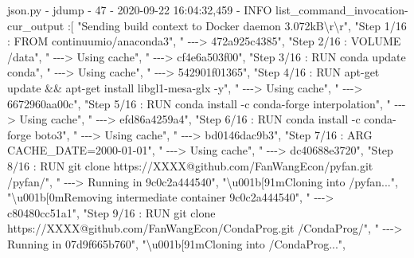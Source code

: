 \documentclass[
]{book}
\newenvironment{Shaded}{\begin{snugshade}}{\end{snugshade}}
\newcommand{\ExtensionTok}[1]{#1}
\newcommand{\NormalTok}[1]{#1}
\newcommand{\StringTok}[1]{\textcolor[rgb]{0.31,0.60,0.02}{#1}}
\begin{document}
\begin{Shaded}
\begin{Highlighting}[]
\ExtensionTok{json.py}\NormalTok{ {-} jdump {-} 47 {-}  2020{-}09{-}22 16:04:32,459 {-} INFO list\_command\_invocation{-}cur\_output}
\NormalTok{:[}
    \StringTok{"Sending build context to Docker daemon  3.072kB\textbackslash{}r\textbackslash{}r"}\NormalTok{,}
    \StringTok{"Step 1/16 : FROM continuumio/anaconda3"}\NormalTok{,}
    \StringTok{" {-}{-}{-}\textgreater{} 472a925c4385"}\NormalTok{,}
    \StringTok{"Step 2/16 : VOLUME /data"}\NormalTok{,}
    \StringTok{" {-}{-}{-}\textgreater{} Using cache"}\NormalTok{,}
    \StringTok{" {-}{-}{-}\textgreater{} cf4e6a503f00"}\NormalTok{,}
    \StringTok{"Step 3/16 : RUN conda update conda"}\NormalTok{,}
    \StringTok{" {-}{-}{-}\textgreater{} Using cache"}\NormalTok{,}
    \StringTok{" {-}{-}{-}\textgreater{} 542901f01365"}\NormalTok{,}
    \StringTok{"Step 4/16 : RUN apt{-}get update \&\& apt{-}get install libgl1{-}mesa{-}glx {-}y"}\NormalTok{,}
    \StringTok{" {-}{-}{-}\textgreater{} Using cache"}\NormalTok{,}
    \StringTok{" {-}{-}{-}\textgreater{} 6672960aa00c"}\NormalTok{,}
    \StringTok{"Step 5/16 : RUN conda install {-}c conda{-}forge interpolation"}\NormalTok{,}
    \StringTok{" {-}{-}{-}\textgreater{} Using cache"}\NormalTok{,}
    \StringTok{" {-}{-}{-}\textgreater{} efd86a4259a4"}\NormalTok{,}
    \StringTok{"Step 6/16 : RUN conda install {-}c conda{-}forge boto3"}\NormalTok{,}
    \StringTok{" {-}{-}{-}\textgreater{} Using cache"}\NormalTok{,}
    \StringTok{" {-}{-}{-}\textgreater{} bd0146dac9b3"}\NormalTok{,}
    \StringTok{"Step 7/16 : ARG CACHE\_DATE=2000{-}01{-}01"}\NormalTok{,}
    \StringTok{" {-}{-}{-}\textgreater{} Using cache"}\NormalTok{,}
    \StringTok{" {-}{-}{-}\textgreater{} dc40688e3720"}\NormalTok{,}
    \StringTok{"Step 8/16 : RUN git clone https://XXXX@github.com/FanWangEcon/pyfan.git /pyfan/"}\NormalTok{,}
    \StringTok{" {-}{-}{-}\textgreater{} Running in 9c0c2a444540"}\NormalTok{,}
    \StringTok{"\textbackslash{}u001b[91mCloning into \textquotesingle{}/pyfan\textquotesingle{}..."}\NormalTok{,}
    \StringTok{"\textbackslash{}u001b[0mRemoving intermediate container 9c0c2a444540"}\NormalTok{,}
    \StringTok{" {-}{-}{-}\textgreater{} c80480cc51a1"}\NormalTok{,}
    \StringTok{"Step 9/16 : RUN git clone https://XXXX@github.com/FanWangEcon/CondaProg.git /CondaProg/"}\NormalTok{,}
    \StringTok{" {-}{-}{-}\textgreater{} Running in 07d9f665b760"}\NormalTok{,}
    \StringTok{"\textbackslash{}u001b[91mCloning into \textquotesingle{}/CondaProg\textquotesingle{}..."}\NormalTok{,}

\end{Highlighting}
\end{Shaded}
\end{document}
